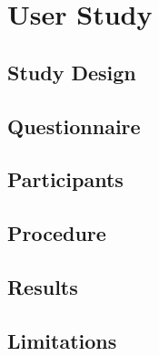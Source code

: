 \documentclass[../medieninformatik-arbeit.tex]{subfiles}
\begin{document}
\label{ch:study}
\section{User Study}

\subsection{Study Design}
\subsection{Questionnaire}
\subsection{Participants}
\subsection{Procedure}
\subsection{Results}
\subsection{Limitations}
\end{document}
